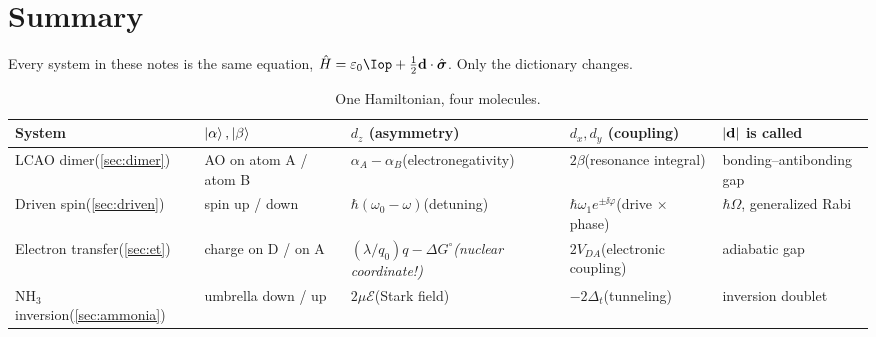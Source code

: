 \section{Summary}
\label{sec:summary}

Every system in these notes is the same equation,
$\Hop = \varepsilon_0\Iop + \half\dvec\cdot\pauliv$. Only the dictionary changes.

\begin{table}[h]
\centering
\small
\setlength{\tabcolsep}{5pt}
\begin{tabular}{@{}p{2.55cm}p{2.75cm}p{3.1cm}p{2.5cm}p{2.9cm}@{}}
\toprule
\textbf{System} & $\ket{\alpha},\ket{\beta}$ & $d_z$ (asymmetry) & $d_x,d_y$ (coupling)
  & $|\mathbf{d}|$ is called \\
\midrule
LCAO dimer\newline(\cref{sec:dimer})
  & AO on atom A / atom B
  & $\alpha_A-\alpha_B$\newline (electronegativity)
  & $2\beta$\newline (resonance integral)
  & bonding--antibonding gap \\[4pt]
Driven spin\newline(\cref{sec:driven})
  & spin up / down
  & $\hbar(\omega_0-\omega)$\newline (detuning)
  & $\hbar\omega_1 e^{\pm\ii\varphi}$\newline (drive $\times$ phase)
  & $\hbar\Omega$, generalized Rabi \\[4pt]
Electron transfer\newline(\cref{sec:et})
  & charge on D / on A
  & $(\lambda/q_0)q-\Delta G^\circ$\newline \emph{(nuclear coordinate!)}
  & $2V_{DA}$\newline (electronic coupling)
  & adiabatic gap \\[4pt]
NH$_3$ inversion\newline(\cref{sec:ammonia})
  & umbrella down / up
  & $2\mu\mathcal{E}$\newline (Stark field)
  & $-2\Delta_t$\newline (tunneling)
  & inversion doublet \\
\bottomrule
\end{tabular}
\caption{One Hamiltonian, four molecules.}
\label{tab:dictionary}
\end{table}

